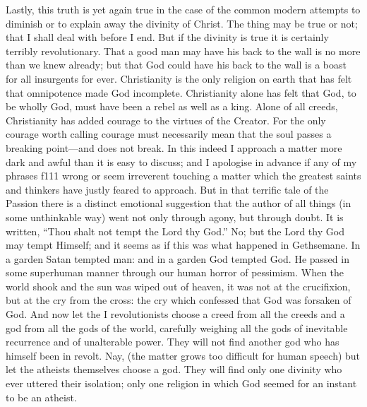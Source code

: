 \documentclass{book}
\begin{document}
Lastly, this truth is yet again true in the case of the common modern attempts to diminish or to explain away the divinity of Christ. The thing may be true or not; that I shall deal with before I end. But if the divinity is true it is certainly terribly revolutionary. That a good man may have his back to the wall is no more than we knew already; but that God could have his back to the wall is a boast for all insurgents for ever. Christianity is the only religion on earth that has felt that omnipotence made God incomplete. Christianity alone has felt that God, to be wholly God, must have been a rebel as well as a king. Alone of all creeds, Christianity has added courage to the virtues of the Creator. For the only courage worth calling courage must necessarily mean that the soul passes a breaking point—and does not break. In this indeed I approach a matter more dark and awful than it is easy to discuss; and I apologise in advance if any of my phrases f111 wrong or seem irreverent touching a matter which the greatest saints and thinkers have justly feared to approach. But in that terrific tale of the Passion there is a distinct emotional suggestion that the author of all things (in some unthinkable way) went not only through agony, but through doubt. It is written, “Thou shalt not tempt the Lord thy God.” No; but the Lord thy God may tempt Himself; and it seems as if this was what happened in Gethsemane. In a garden Satan tempted man: and in a garden God tempted God. He passed in some superhuman manner through our human horror of pessimism. When the world shook and the sun was wiped out of heaven, it was not at the crucifixion, but at the cry from the cross: the cry which confessed that God was forsaken of God. And now let the I revolutionists choose a creed from all the creeds and a god from all the gods of the world, carefully weighing all the gods of inevitable recurrence and of unalterable power. They will not find another god who has himself been in revolt. Nay, (the matter grows too difficult for human speech) but let the atheists themselves choose a god. They will find only one divinity who ever uttered their isolation; only one religion in which God seemed for an instant to be an atheist.
\end{document}
